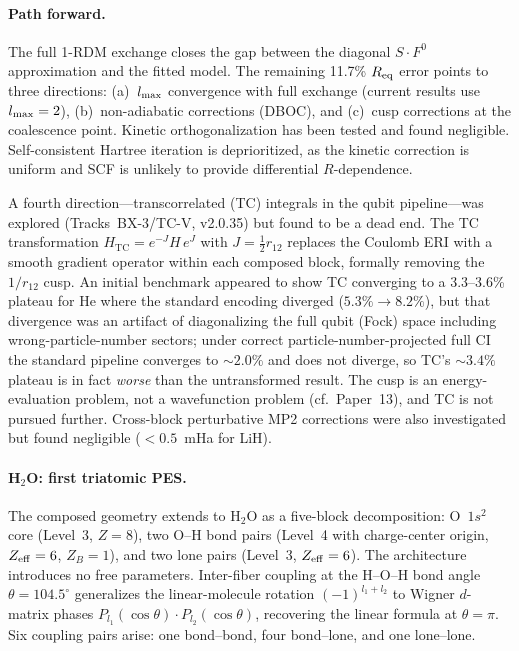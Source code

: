 \documentclass[aps,pra,twocolumn,superscriptaddress,longbibliography,floatfix]{revtex4-2}
\begin{document}
\paragraph{Path forward.}
The full 1-RDM exchange closes the gap between the diagonal
$S \cdot F^0$ approximation and the fitted model.  The remaining
11.7\% $R_{\rm eq}$ error points to three directions: (a)~$l_{\rm max}$
convergence with full exchange (current results use $l_{\rm max} = 2$),
(b)~non-adiabatic corrections (DBOC), and (c)~cusp corrections at the
coalescence point.  Kinetic orthogonalization has been tested and found
negligible.  Self-consistent Hartree iteration is deprioritized, as
the kinetic correction is uniform and SCF is unlikely to provide
differential $R$-dependence.

A fourth direction---transcorrelated (TC) integrals in the qubit
pipeline---was explored (Tracks~BX-3/TC-V, v2.0.35) but found to be a
dead end.  The TC transformation $H_{\mathrm{TC}} = e^{-J} H\, e^{J}$
with $J = \tfrac{1}{2}r_{12}$ replaces the Coulomb ERI with a smooth
gradient operator within each composed block, formally removing the
$1/r_{12}$ cusp.  An initial benchmark appeared to show TC converging
to a 3.3--3.6\% plateau for He where the standard encoding diverged
($5.3\%\to8.2\%$), but that divergence was an artifact of diagonalizing
the full qubit (Fock) space including wrong-particle-number sectors;
under correct particle-number-projected full CI the standard pipeline
converges to ${\sim}2.0\%$ and does not diverge, so TC's ${\sim}3.4\%$
plateau is in fact \emph{worse} than the untransformed result.  The
cusp is an energy-evaluation problem, not a wavefunction problem
(cf.\ Paper~13), and TC is not pursued further.  Cross-block
perturbative MP2 corrections were also investigated but found
negligible ($< 0.5$~mHa for LiH).

\paragraph{H$_2$O: first triatomic PES.}
The composed geometry extends to H$_2$O as a five-block decomposition:
O~$1s^2$ core (Level~3, $Z=8$), two O--H bond pairs (Level~4 with
charge-center origin, $Z_{\rm eff}=6$, $Z_B=1$), and two lone pairs
(Level~3, $Z_{\rm eff}=6$).  The architecture introduces no free
parameters.  Inter-fiber coupling at the H--O--H bond angle
$\theta = 104.5^\circ$ generalizes the linear-molecule rotation
$(-1)^{l_1 + l_2}$ to Wigner $d$-matrix phases
$P_{l_1}(\cos\theta) \cdot P_{l_2}(\cos\theta)$, recovering the
linear formula at $\theta = \pi$.  Six coupling pairs arise:
one bond--bond, four bond--lone, and one lone--lone.
\end{document}
